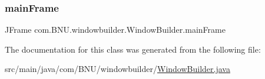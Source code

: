 \subsubsection{\texorpdfstring{main\+Frame}{mainFrame}}
{\footnotesize\ttfamily J\+Frame com.\+B\+N\+U.\+windowbuilder.\+Window\+Builder.\+main\+Frame\hspace{0.3cm}{\ttfamily [static]}}



The documentation for this class was generated from the following file\+:\begin{DoxyCompactItemize}
\item 
src/main/java/com/\+B\+N\+U/windowbuilder/\mbox{\hyperlink{_window_builder_8java}{Window\+Builder.\+java}}\end{DoxyCompactItemize}
